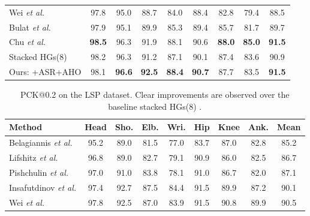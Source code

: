 \documentclass[10pt,twocolumn,letterpaper]{article}
\begin{document}
\begin{table}[htb]
\begin{center}
\begin{tabular}{@{}lcccccccc@{}}
Wei \textit{et al.}\cite{wei2016convolutional} & 97.8 & 95.0 & 88.7 & 84.0 & 88.4 & 82.8 & 79.4 & 88.5\\
Bulat \textit{et al.}\cite{bulat2016human} & 97.9 & 95.1 & 89.9 & 85.3 & 89.4 & 85.7 & 81.7 & 89.7\\
Chu \textit{et al.}\cite{chu2017multi} & {\bf 98.5} & 96.3 & 91.9 & 88.1 & 90.6 & {\bf 88.0} & {\bf 85.0} & {\bf 91.5}\\
\hline
Stacked HGs(8) \cite{newell2016stacked} & 98.2 & 96.3 & 91.2 & 87.1 & 90.1 & 87.4 & 83.6 & 90.9\\
Ours: +ASR+AHO & 98.1  & {\bf 96.6}  & {\bf 92.5}  & {\bf 88.4}  & {\bf 90.7}  & 87.7 & 83.5 & {\bf 91.5}\\
\bottomrule
\end{tabular}
\end{center}
\vspace{-10pt}
\end{table}\begin{table}[htb]
\begin{center}
\caption{PCK@0.2 on the LSP dataset. Clear improvements are observed over the baseline stacked HGs(8) \cite{newell2016stacked}.}
\label{tb:LSP}
\small
\setlength\tabcolsep{1.5pt}
\begin{tabular}{@{}lcccccccc@{}}
\toprule
Method & Head & Sho. & Elb. & Wri. & Hip & Knee & Ank. & Mean\\
\hline
Belagiannis \textit{et al.}\cite{belagiannis2017recurrent} & 95.2 & 89.0 & 81.5 & 77.0 & 83.7 & 87.0 & 82.8 & 85.2\\
Lifshitz \textit{et al.}\cite{lifshitz2016human} & 96.8 & 89.0 & 82.7 & 79.1 & 90.9 & 86.0 & 82.5 & 86.7\\
Pishchulin \textit{et al.}\cite{pishchulin2016deepcut} &  97.0 & 91.0 & 83.8 & 78.1 & 91.0 & 86.7 & 82.0 & 87.1\\
Insafutdinov \textit{et al.}\cite{insafutdinov2016deepercut}& 97.4 & 92.7 & 87.5 & 84.4 & 91.5 & 89.9 & 87.2 & 90.1\\
Wei \textit{et al.}\cite{wei2016convolutional}& 97.8 & 92.5 & 87.0 & 83.9 & 91.5 & 90.8 & 89.9 & 90.5\\

\end{tabular}
\end{center}
\end{table}
\end{document}
